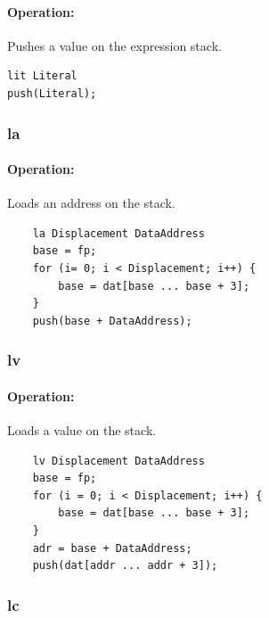 \paragraph{Operation:}
Pushes a value on the expression stack.

\begin{lstlisting}
lit Literal
push(Literal);
\end{lstlisting}


\subsubsection{la}

\paragraph{Operation:}
Loads an address on the stack.

	\begin{lstlisting}
	la Displacement DataAddress
	base = fp;
	for (i= 0; i < Displacement; i++) {
		base = dat[base ... base + 3];
	}
	push(base + DataAddress);
	\end{lstlisting}

\subsubsection{lv}

\paragraph{Operation:}
Loads a value on the stack.

	\begin{lstlisting}
	lv Displacement DataAddress
	base = fp;
	for (i = 0; i < Displacement; i++) {
		base = dat[base ... base + 3];
	}
	adr = base + DataAddress;
	push(dat[addr ... addr + 3]);
	\end{lstlisting}

\subsubsection{lc}

